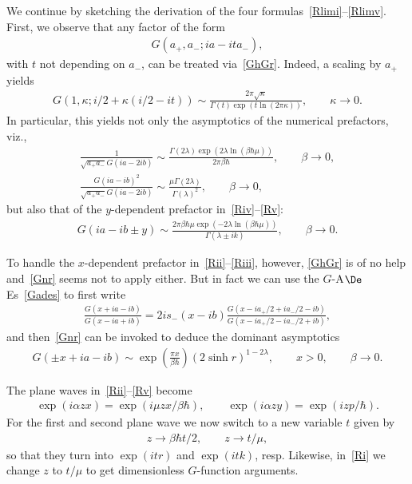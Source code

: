 \documentclass[pdftex]{sigma}
\numberwithin{equation}{section}
\begin{document}
We continue by sketching the derivation of the four formulas~\eqref{Rlimi}--\eqref{Rlimv}. First, we observe that any factor of the form
\begin{gather}
G(a_{+},a_-;ia-ita_-),
\end{gather}
with $t$ not depending on $a_-$, can be treated via~\eqref{GhGr}. Indeed, a scaling by $a_+$ yields
\begin{gather}
G(1,\kappa;i/2+\kappa(i/2-it))\sim \frac{2\pi \sqrt{\kappa}}{\Gamma(t)\exp(t\ln(2\pi \kappa))},\qquad \kappa \to 0.
\end{gather}
In particular, this yields not only the asymptotics of the numerical prefactors, viz.,
\begin{gather}
\frac{1}{\sqrt{a_+a_-}G(ia-2ib)}\sim \frac{\Gamma(2\lambda)\exp(2\lambda \ln(\beta\hbar\mu))}{2\pi\beta\hbar},\qquad \beta\to 0,
\\
\frac{G(ia-ib)^2}{\sqrt{a_+a_-}G(ia-2ib)}\sim \frac{\mu\Gamma(2\lambda)}{\Gamma(\lambda)^2},\qquad \beta\to 0,
\end{gather}
but also that of the $y$-dependent prefactor in~\eqref{Riv}--\eqref{Rv}:
\begin{gather}
G(ia-ib\pm y)\sim \frac{2\pi\beta\hbar\mu\exp(-2\lambda\ln(\beta\hbar\mu))}{\Gamma(\lambda\pm ik)},\qquad \beta\to 0.
\end{gather}

To handle the $x$-dependent prefactor in~\eqref{Rii}--\eqref{Riii}, however, \eqref{GhGr} is of no help and~\eqref{Gnr} seems not to apply either. But in fact we can use the $G$-A$\De$Es~\eqref{Gades} to f\/irst write
\begin{gather}
\frac{G(x+ia-ib)}{G(x-ia+ib)}=2is_-(x-ib)\frac{G(x-ia_+/2+ia_-/2-ib)}{G(x-ia_+/2-ia_-/2+ib)},
\end{gather}
and then~\eqref{Gnr} can be invoked to deduce the dominant asymptotics
\begin{gather}\label{Gx}
G(\pm x+ia-ib)\sim \exp\left( \frac{\pi x}{\beta\hbar}\right)(2\sinh r)^{1-2\lambda},\qquad x>0,\qquad \beta\to 0.
\end{gather}

The plane waves in~\eqref{Rii}--\eqref{Rv} become
\begin{gather}
\exp(i\alpha zx)=\exp(i\mu zx/\beta\hbar),\qquad
\exp(i\alpha zy)=\exp(i zp/\hbar).
\end{gather}
For the f\/irst and second plane wave we now switch to a new variable $t$ given by
\begin{gather}
z\to \beta\hbar t/2,\qquad z\to t/\mu,
\end{gather}
so that they turn into
$\exp(itr)$ and $\exp(itk)$,
resp. Likewise, in~\eqref{Ri} we change $z$ to $t/\mu$ to get dimensionless $G$-function arguments.
\end{document}
